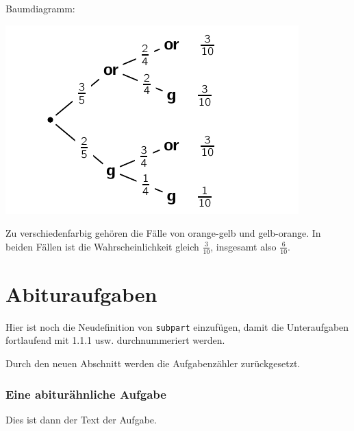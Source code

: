 \documentclass[a4paper,12pt]{article}
\begin{document}
\begin{solution}
\begin{subparts}
	\subpart Baumdiagramm:

	\includegraphics{baumdiagramm}

	\subpart Zu verschiedenfarbig gehören die Fälle von orange-gelb und gelb-orange. In beiden Fällen ist die Wahrscheinlichkeit gleich $\frac{3}{10}$, insgesamt also $\frac{6}{10}$.
\end{subparts}
\end{solution}






\section{Abituraufgaben}

Hier ist noch die Neudefinition von \texttt{subpart} einzufügen, damit die Unteraufgaben fortlaufend mit 1.1.1 usw. durchnummeriert werden.

Durch den neuen Abschnitt werden die Aufgabenzähler zurückgesetzt.

\subsubsection*{Eine abiturähnliche Aufgabe}
 Dies ist dann der Text der Aufgabe.
\end{document}
